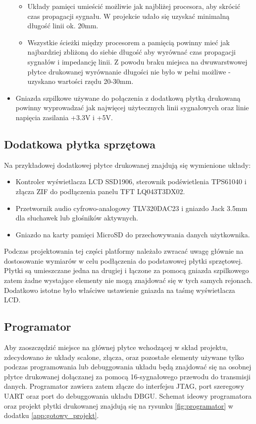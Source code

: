 \documentclass[a4paper,12pt]{book}
\begin{document}
\begin{itemize}
							\begin{itemize}
								\item Układy pamięci umieścić możliwie jak najbliżej procesora, aby skrócić czas propagacji sygnału. W projekcie udało się uzyskać minimalną długość linii ok. 20mm.
								\item Wszystkie ścieżki między procesorem a pamięcią powinny mieć jak najbardziej zbliżoną do siebie długość aby wyrównać czas propagacji sygnałów i impedancję linii. Z powodu braku miejsca na dwuwarstwowej płytce drukowanej wyrównanie długości nie było w pełni możliwe - uzyskano wartości rzędu 20-30mm.
							\end{itemize}
						\item Gniazda szpilkowe używane do połączenia z dodatkową płytką drukowaną powinny wyprowadzać jak najwięcej użytecznych linii sygnałowych oraz linie napięcia zasilania +3.3V i +5V.
					\end{itemize}
			\subsection{Dodatkowa płytka sprzętowa}
				\label{sec:ext_board}
				Na przykładowej dodatkowej płytce drukowanej znajdują się wymienione układy:
				\begin{itemize}
					\item Kontroler wyświetlacza LCD SSD1906, sterownik podświetlenia TPS61040 i złącza ZIF do podłączenia panelu TFT LQ043T3DX02.
					\item Przetwornik audio cyfrowo-analogowy TLV320DAC23 i gniazdo Jack 3.5mm dla słuchawek lub głośników aktywnych.
					\item Gniazdo na karty pamięci MicroSD do przechowywania danych użytkownika.
				\end{itemize}
				Podczas projektowania tej części platformy należało zwracać uwagę głównie na dostosowanie wymiarów w celu podłączenia do podstawowej płytki sprzętowej. Płytki są umieszczane jedna na drugiej i łączone za pomocą gniazda szpilkowego zatem żadne wystające elementy nie mogą znajdować się w tych samych rejonach. Dodatkowo istotne było właściwe ustawienie gniazda na taśmę wyświetlacza LCD.
			\subsection{Programator}
				\label{sec:programator}
				Aby zaoszczędzić miejsce na głównej płytce wchodzącej w skład projektu, zdecydowano że układy scalone, złącza, oraz pozostałe elementy używane tylko podczas programowania lub debuggowania układu będą znajdować się na osobnej płytce drukowanej dołączanej za pomocą 16-sygnałowego przewodu do transmisji danych. Programator zawiera zatem złącze do interfejsu JTAG, port szeregowy UART oraz port do debuggowania układu DBGU. Schemat ideowy programatora oraz projekt płytki drukowanej znajdują się na rysunku \ref{fig:programator} w dodatku \ref{app:gotowy_projekt}.
\end{document}
